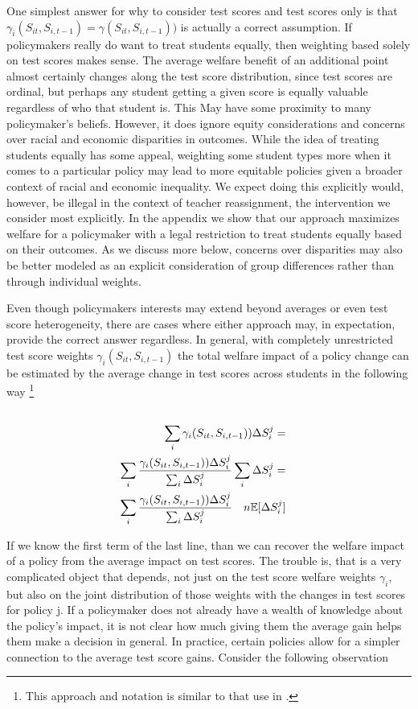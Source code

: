 \documentclass{article}
\theoremstyle{definition}
\theoremstyle{definition}
\theoremstyle{definition}
\theoremstyle{definition}
\begin{document}
    One simplest answer for why to consider test scores and test scores only is that $\gamma_i(S_{it}, S_{i,t-1}) = \gamma(S_{it}, S_{i,t-1}))$ is actually a correct assumption. If policymakers really do want to treat students equally, then weighting based solely on test scores makes sense. The average welfare benefit of an additional point almost certainly changes along the test score distribution, since test scores are ordinal, but perhaps any student getting a given score is equally valuable regardless of who that student is. This May have some proximity to many policymaker's beliefs. However, it does ignore equity considerations and concerns over racial and economic disparities in outcomes. While the idea of treating students equally has some appeal, weighting some student types more when it comes to a particular policy may lead to more equitable policies given a broader context of racial and economic inequality. We expect doing this explicitly would, however, be illegal in the context of teacher reassignment, the intervention we consider most explicitly. In the appendix we show that our approach maximizes welfare for a policymaker with a legal restriction to treat students equally based on their outcomes. As we discuss more below, concerns over disparities may also be better modeled as an explicit consideration of group differences rather than through individual weights. 
    
    Even though policymakers interests may extend beyond averages or even test score heterogeneity, there are cases where either approach may, in expectation, provide the correct answer regardless. In general, with completely unrestricted test score weights $\gamma_i(S_{it}, S_{i,t-1})$ the total welfare impact of a policy change can be estimated by the average change in test scores across students in the following way \footnote{This approach and notation is similar to that use in \cite{Keyser_2020}. }
    \large
    \begin{align*}
       \\ \sum_i \gamma_i(S_{it}, S_{i,t-1})) \Delta S_i^j =&
       \\ \sum_i \frac{\gamma_i(S_{it}, S_{i,t-1}))\Delta S_i^j}{\sum_i \Delta S_i^j} \sum_i \Delta S_i^j =&
       \\ \sum_i \frac{\gamma_i(S_{it}, S_{i,t-1}))\Delta S_i^j}{\sum_i \Delta S_i^j} \quad n \mathbb{E}[\Delta S_i^j] 
    \end{align*}
      \normalsize 
    
    If we know the first term of the last line, than we can recover the welfare impact of a policy from the average impact on test scores. The trouble is, that is a very complicated object that depends, not just on the test score welfare weights $\gamma_i$, but also on the joint distribution of those weights with the changes in test scores for policy j. If a policymaker does not already have a wealth of knowledge about the policy's impact, it is not clear how much giving them the average gain helps them make a decision in general. In practice, certain policies allow for a simpler connection to the average test score gains. Consider the following observation 
    
\end{document}
